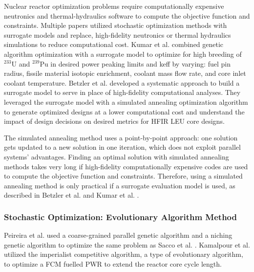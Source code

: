 Nuclear reactor optimization problems require computationally 
expensive neutronics and thermal-hydraulics software to compute the objective 
function and constraints. 
Multiple papers utilized stochastic optimization methods with surrogate models 
and replace, high-fidelity neutronics or thermal hydraulics 
simulations to reduce computational cost.
Kumar et al. \cite{kumar_new_2015} combined genetic algorithm optimization 
with a surrogate model to optimize for high breeding of $^{233}$U and $^{239}$Pu 
in desired power peaking limits and keff by varying: fuel pin 
radius,  fissile material isotopic enrichment, coolant mass flow rate, and 
core inlet coolant temperature.
Betzler et al. \cite{betzler_design_2019} developed a systematic approach to 
build a surrogate model to serve in place of high-fidelity computational 
analyses. 
They leveraged the surrogate model with a simulated annealing optimization 
algorithm to generate optimized designs at a lower computational cost and
understand the impact of design decisions on desired metrics for \gls{HFIR} \gls{LEU} 
core designs.

The simulated annealing method uses a point-by-point approach:
one solution gets updated to a new solution in one iteration, which does not 
exploit parallel systems' advantages.
Finding an optimal solution with simulated annealing methods takes very 
long if high-fidelity computationally expensive codes are used to compute 
the objective function and constraints.
Therefore, using a simulated annealing method is only practical if a 
surrogate evaluation model is used, as described in Betzler et al. 
\cite{betzler_design_2019} and Kumar et al. \cite{kumar_new_2015}.

\subsubsection{Stochastic Optimization: Evolutionary Algorithm Method}
Peireira et al. \cite{pereira_coarse-grained_2003,pereira_parallel_2008} 
used a coarse-grained parallel genetic algorithm and a niching genetic algorithm
to optimize the same problem as Sacco et al. \cite{sacco_two_2006}. 
Kamalpour et al. \cite{kamalpour_smart_2020} utilized the imperialist competitive 
algorithm, a type of evolutionary algorithm, to optimize a \gls{FCM} fuelled 
\gls{PWR} to extend the reactor core cycle length. 

